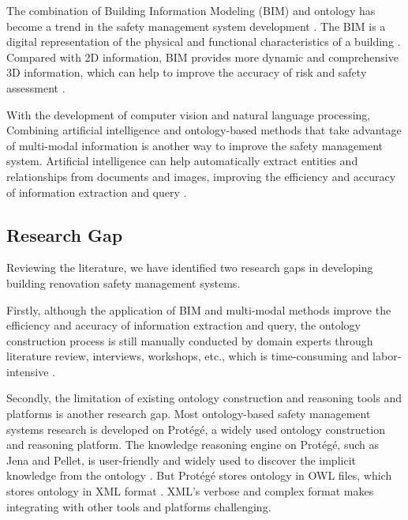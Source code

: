 The combination of Building Information Modeling (BIM) and ontology has become a trend in the safety management system development \cite[]{qi2023bim,zhou2023bim,shen2022safety}.
The BIM is a digital representation of the physical and functional characteristics of a building \cite[]{qi2023bim}.
Compared with 2D information, BIM provides more dynamic and comprehensive 3D information, which can help to improve the accuracy of risk and safety assessment \cite[]{ding2016construction}. 

With the development of computer vision and natural language processing, 
Combining artificial intelligence and ontology-based methods that take advantage of multi-modal information is another way to improve the safety management system.
Artificial intelligence can help automatically extract entities and relationships from documents and images, improving the efficiency and accuracy of information extraction and query \cite[]{zhong2020ontology,zhang2022automatic}.

\subsection*{Research Gap}
\label{sec:research_gap}
Reviewing the literature, we have identified two research gaps in developing building renovation safety management systems.

Firstly, although the application of BIM and multi-modal methods improve the efficiency and accuracy of information extraction and query, 
the ontology construction process is still manually conducted by domain experts through literature review, interviews, workshops, etc.,
which is time-consuming and labor-intensive \cite[]{doukari2024ontology,amorocho2021reno,shen2022safety,xing2019ontology,zhou2023bim}.

Secondly, the limitation of existing ontology construction and reasoning tools and platforms is another research gap.
Most ontology-based safety management systems research is developed on Protégé, a widely used ontology construction and reasoning platform. 
The knowledge reasoning engine on Protégé, such as Jena and Pellet, is user-friendly and widely used to discover the implicit knowledge from the ontology \cite[]{amorocho2021reno,doukari2024ontology,doukari2023bim}.   
But Protégé stores ontology in OWL files, which stores ontology in XML format \cite[]{mohan2011constructing}.  
XML's verbose and complex format makes integrating with other tools and platforms challenging.   

